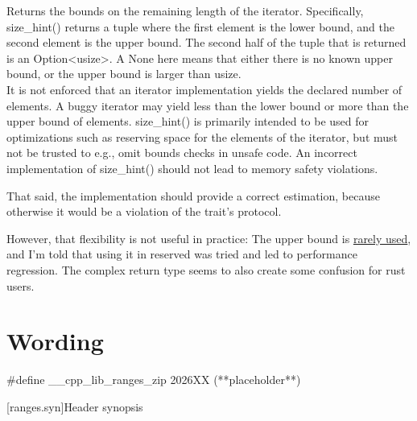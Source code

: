 \documentclass{wg21}
\begin{document}
\begin{quoteblock}
\textbf{}


Returns the bounds on the remaining length of the iterator.
Specifically, size_hint() returns a tuple where the first element is the lower bound, and the second element is the upper bound.
The second half of the tuple that is returned is an Option<usize>. A None here means that either there is no known upper bound, or the upper bound is larger than usize.\\

It is not enforced that an iterator implementation yields the declared number of elements. A buggy iterator may yield less than the lower bound or more than the upper bound of elements.
size_hint() is primarily intended to be used for optimizations such as reserving space for the elements of the iterator, but must not be trusted to e.g., omit bounds checks in unsafe code. An incorrect implementation of size_hint() should not lead to memory safety violations.

That said, the implementation should provide a correct estimation, because otherwise it would be a violation of the trait’s protocol.
\end{quoteblock}

However, that flexibility is not useful in practice:
The upper bound is \href{https://internals.rust-lang.org/t/is-size-hint-1-ever-used/8187?u=scottmcm}{rarely used},
and I'm told that using it in reserved was tried and led to performance regression.
The complex return type seems to also create some confusion for rust users.

\section{Wording}

\begin{addedblock}
\begin{codeblock}
    #define __cpp_lib_ranges_zip 2026XX (**placeholder**)
\end{codeblock}
\end{addedblock}

[ranges.syn]{Header  synopsis}
\end{document}
